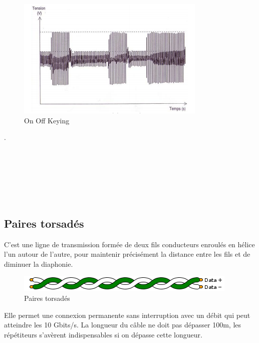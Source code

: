 \documentclass[11pt, a4paper, twoside]{book}
\begin{document}
\begin{figure}[h!]
\centering
\includegraphics[width=\textwidth]{ook}
\caption{On Off Keying}
\end{figure}























.\\\\\\\\\\\\\\
\subsection{Paires torsadés}
C’est une ligne de transmission formée de deux fils conducteurs enroulés en hélice l’un autour de l’autre, pour maintenir précisément la distance entre les fils et de diminuer la diaphonie.
\begin{figure}[h!]
\centering
\includegraphics[width=\textwidth]{twistedPair}
\caption{Paires torsadés}
\end{figure}
Elle permet une connexion permanente sans interruption avec un débit qui peut atteindre les 10 Gbits/s. La longueur du câble ne doit pas dépasser 100m, les répétiteurs s'avèrent indispensables si on dépasse cette longueur.
\end{document}
